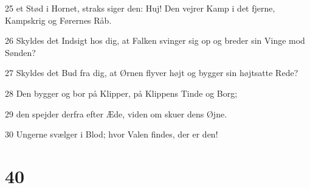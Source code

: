 \par 25 et Stød i Hornet, straks siger den: Huj! Den vejrer Kamp i det fjerne, Kampskrig og Førernes Råb.
\par 26 Skyldes det Indsigt hos dig, at Falken svinger sig op og breder sin Vinge mod Sønden?
\par 27 Skyldes det Bud fra dig, at Ørnen flyver højt og bygger sin højtsatte Rede?
\par 28 Den bygger og bor på Klipper, på Klippens Tinde og Borg;
\par 29 den spejder derfra efter Æde, viden om skuer dens Øjne.
\par 30 Ungerne svælger i Blod; hvor Valen findes, der er den!

\chapter{40}

